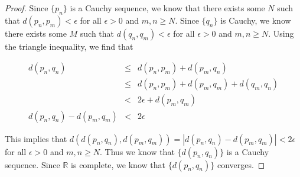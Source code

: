 \documentclass[psamsfonts]{amsart}
\theoremstyle{definition}
\theoremstyle{remark}
\numberwithin{equation}{section}
\begin{document}
\begin{proof}
Since $\{ p_n \}$ is a Cauchy sequence, we know that there exists some $N$ such that $d(p_n,p_m) < \epsilon$ for all $\epsilon > 0$ and $m,n \geq N$. Since $\{q_n \}$ is Cauchy, we know there exists some $M$ such that $d(q_n,q_m) < \epsilon$ for all $\epsilon > 0$ and $m,n \geq N$. Using the triangle inequality, we find that 

\begin{eqnarray}
d(p_n,q_n) &\leq& d(p_n, p_m) + d(p_m, q_n) \\
&\leq& d(p_n,p_m) + d(p_m, q_m) + d(q_m, q_n) \nonumber \\
&<& 2 \epsilon + d(p_m, q_m) \nonumber \\
d(p_n,q_n) - d(p_m,q_m) &<& 2 \epsilon 
\end{eqnarray}

This implies that $d( d(p_n,q_n), d(p_m,q_m) ) = |d(p_n,q_n) - d(p_m, q_m) | < 2 \epsilon$ for all $\epsilon >0$ and $m,n \geq N$. Thus we know that $\{ d(p_n,q_n) \}$ is a Cauchy sequence. Since $\mathbb{R}$ is complete, we know that $\{ d(p_n,q_n) \}$ converges.
\end{proof}
\end{document}

